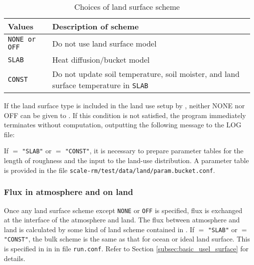 \begin{table}[hbt]
\begin{center}
  \caption{Choices of land surface scheme}
  \label{tab:nml_land}
  \begin{tabularx}{150mm}{lX} \hline
    \rowcolor[gray]{0.9}  Values & Description of scheme \\ \hline
      \verb|NONE or OFF| & Do not use land surface model              \\
      \verb|SLAB|          & Heat diffusion/bucket model                   \\
      \verb|CONST|         & Do not update soil temperature, soil moister, and land surface temperature in \verb|SLAB| \\
    \hline
  \end{tabularx}
\end{center}
\end{table}

If the land surface type is included in the land use setup by , neither NONE nor OFF can be given to . If this condition is not satisfied, the program immediately terminates without computation, outputting the following message to the LOG file:

If  $=$ \verb|"SLAB"| or  $=$ \verb|"CONST"|,
it is necessary to prepare parameter tables for the length of roughness and the input to the land-use distribution.
A parameter table is provided 
in the file \verb|scale-rm/test/data/land/param.bucket.conf|.\\


\subsubsection{Flux in atmosphere and on land}
Once any land surface scheme except \verb|NONE| or \verb|OFF| is specified, flux is exchanged at the interface of the atmosphere and land. The flux between atmosphere and land is calculated by some kind of land scheme contained in \scalerm. If  $=$ \verb|"SLAB"| or  $=$ \verb|"CONST"|, the bulk scheme is the same as that for ocean or ideal land surface. This is specified in  in  in file \verb|run.conf|. Refer to Section \ref{subsec:basic_usel_surface} for details.

